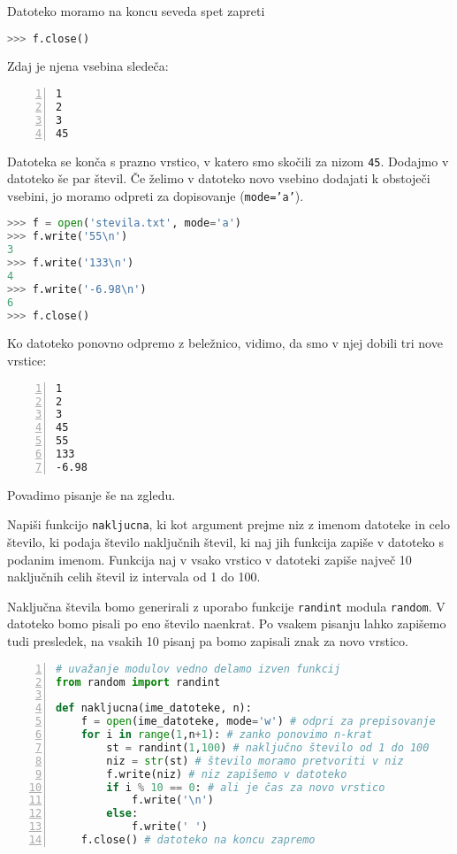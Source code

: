 Datoteko moramo na koncu seveda spet zapreti
\begin{lstlisting}[language=Python, showstringspaces=false]
>>> f.close()
\end{lstlisting}
Zdaj je njena vsebina sledeča:
\begin{lstlisting}[showstringspaces=false,numbers=left,showlines=true]
1
2
3
45

\end{lstlisting}
Datoteka se konča s prazno vrstico, v katero smo skočili za nizom \texttt{45}. Dodajmo v datoteko še par števil. Če želimo v datoteko novo vsebino dodajati k obstoječi vsebini, jo moramo odpreti za dopisovanje (\texttt{mode='a'}).
\begin{lstlisting}[language=Python, showstringspaces=false]
>>> f = open('stevila.txt', mode='a')
>>> f.write('55\n')
3
>>> f.write('133\n')
4
>>> f.write('-6.98\n')
6
>>> f.close()
\end{lstlisting}
Ko datoteko ponovno odpremo z beležnico, vidimo, da smo v njej dobili tri nove vrstice:
\begin{lstlisting}[showstringspaces=false,numbers=left,showlines=true]
1
2
3
45
55
133
-6.98

\end{lstlisting}

Povadimo pisanje še na zgledu.
\begin{zgled}
Napiši funkcijo \texttt{nakljucna}, ki kot argument prejme niz z imenom datoteke in celo število, ki podaja število naključnih števil, ki naj jih funkcija zapiše v datoteko s podanim imenom. Funkcija naj v vsako vrstico v datoteki zapiše največ 10 naključnih celih števil iz intervala od 1 do 100.
\end{zgled}
\begin{resitev}
Naključna števila bomo generirali z uporabo funkcije \texttt{randint} modula \texttt{random}. V datoteko bomo pisali po eno število naenkrat. Po vsakem pisanju lahko zapišemo tudi presledek, na vsakih 10 pisanj pa bomo zapisali znak za novo vrstico.
\begin{lstlisting}[language=Python, showstringspaces=false,numbers=left]
# uvažanje modulov vedno delamo izven funkcij
from random import randint

def nakljucna(ime_datoteke, n):
    f = open(ime_datoteke, mode='w') # odpri za prepisovanje
    for i in range(1,n+1): # zanko ponovimo n-krat
        st = randint(1,100) # naključno število od 1 do 100
        niz = str(st) # število moramo pretvoriti v niz
        f.write(niz) # niz zapišemo v datoteko 
        if i % 10 == 0: # ali je čas za novo vrstico
            f.write('\n')
        else:
            f.write(' ')
    f.close() # datoteko na koncu zapremo
\end{lstlisting}
\end{resitev}

